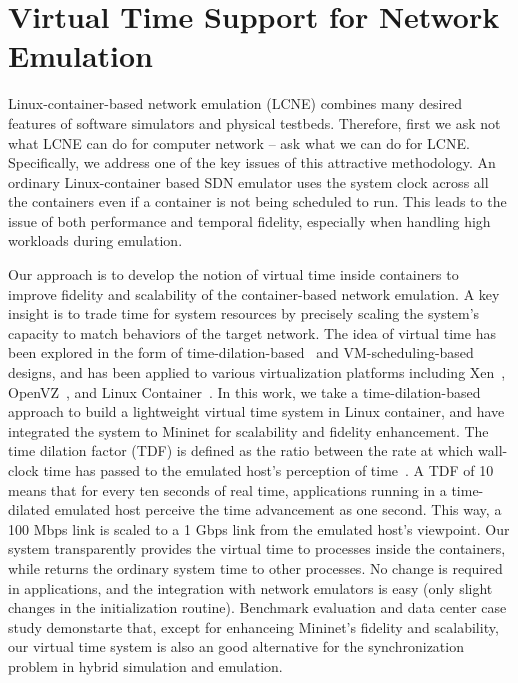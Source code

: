 \section{Virtual Time Support for Network Emulation}
\label{VT:Sec:Intro}

Linux-container-based network emulation (LCNE) combines many desired features of software simulators and physical testbeds.
Therefore, first we ask not what LCNE can do for computer network -- ask what we can do for LCNE.
Specifically, we address one of the key issues of this attractive methodology.
An ordinary Linux-container based SDN emulator uses the system clock across all the containers even if a container is not being scheduled to run.
This leads to the issue of both performance and temporal fidelity, especially when handling high workloads during emulation.

Our approach is to develop the notion of virtual time inside containers to improve fidelity and scalability of the container-based network emulation.
A key insight is to trade time for system resources by precisely scaling the system's capacity to match behaviors of the target network.
The idea of virtual time has been explored in the form of time-dilation-based~\cite{ToInfinityBeyond} and
VM-scheduling-based~\cite{VirtTimeOpenVZ, SliceTime} designs, and has been applied to various virtualization platforms including Xen~\cite{DieCast},
OpenVZ~\cite{VirtTimeOpenVZ}, and Linux Container~\cite{TimeKeeper}.
In this work, we take a time-dilation-based approach to build a lightweight virtual time system in Linux container,
and have integrated the system to Mininet for scalability and fidelity enhancement.
The time dilation factor (TDF) is defined as the ratio between the rate at which wall-clock time has
passed to the emulated host's perception of time~\cite{ToInfinityBeyond}.
A TDF of 10 means that for every ten seconds of real time, applications running in a time-dilated emulated host perceive the time advancement as one second.
This way, a 100 Mbps link is scaled to a 1 Gbps link from the emulated host's viewpoint.
Our system transparently provides the virtual time to processes inside the containers,
while returns the ordinary system time to other processes.
No change is required in applications, and the integration with network emulators is easy (only slight changes in the initialization routine).
Benchmark evaluation and data center case study demonstarte that, except for enhanceing Mininet's fidelity and scalability,
our virtual time system is also an good alternative for the synchronization problem in hybrid simulation and emulation.

